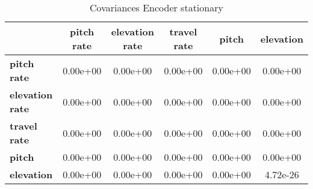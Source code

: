 \begin{table}[h!]
\centering
\begin{tiny}\begin{tabular}{|l|c|c|c|c|c|}
\hline
&\textbf{pitch rate}&\textbf{elevation rate}&\textbf{travel rate}&\textbf{pitch}&\textbf{elevation}\\\hline
\textbf{pitch rate}&0.00e+00&0.00e+00&0.00e+00&0.00e+00&0.00e+00\\\hline
\textbf{elevation rate}&0.00e+00&0.00e+00&0.00e+00&0.00e+00&0.00e+00\\\hline
\textbf{travel rate}&0.00e+00&0.00e+00&0.00e+00&0.00e+00&0.00e+00\\\hline
\textbf{pitch}&0.00e+00&0.00e+00&0.00e+00&0.00e+00&0.00e+00\\\hline
\textbf{elevation}&0.00e+00&0.00e+00&0.00e+00&0.00e+00&4.72e-26\\\hline
\end{tabular}
\end{tiny}
\caption{Covariances Encoder stationary}
\label{table:V_E_stat}
\end{table}